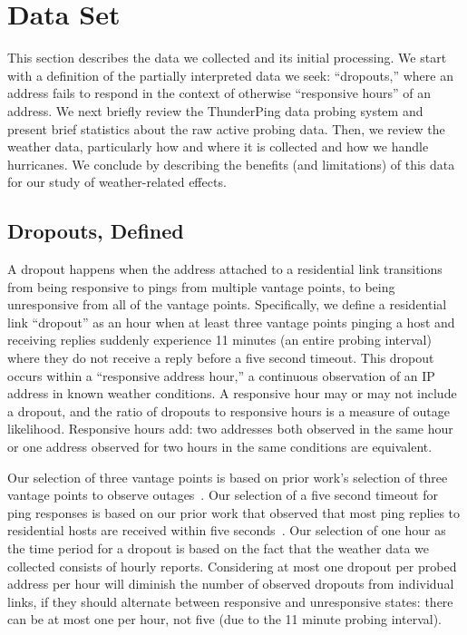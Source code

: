 \section{Data Set}

This section describes the data we collected and its initial
processing.
%
We start with a definition of the partially interpreted data
we seek: ``dropouts,'' where an address fails to respond in
the context of otherwise ``responsive hours'' of an address.
%
We next briefly review the ThunderPing data probing system and
present brief statistics about the raw active probing data.
% 
Then, we review the weather data, particularly how and
where it is collected and how we handle hurricanes.
%
We conclude by describing the benefits (and limitations) of this
data for our study of weather-related effects.

\subsection{Dropouts, Defined} %

A dropout happens when the address attached to a residential link transitions from
being responsive to pings from multiple vantage points, to being unresponsive
from all of the vantage points.
% 
Specifically, we define a residential link ``dropout'' as an hour when at least three
vantage points pinging a host and receiving replies suddenly experience 11 minutes
(an entire probing interval) where they do not receive a 
reply before a five second timeout.
%
This dropout occurs within a ``responsive address hour,'' a
continuous observation of an IP address in known weather
conditions.  A responsive hour may or may not include a
dropout, and the ratio of dropouts to responsive hours is a
measure of outage likelihood.  Responsive hours add: two
addresses both observed in the same hour or one address
observed for two hours in the same conditions are equivalent.

Our selection of three vantage points is based on prior work's selection
of three vantage points to observe outages~\cite{trinocular}.
%
Our selection of a five second timeout for ping responses is based on our
prior work that observed that most ping replies to residential
hosts are received within five seconds~\cite{timeouts-imc}.
%
Our selection of one hour as the time period for a dropout is based on the fact
that the weather data we collected consists of hourly reports.
%
Considering at most one dropout per probed address per hour will diminish the
number of observed dropouts from individual links, if they should alternate
between responsive and unresponsive states: there can be at most one per hour,
not five (due to the 11 minute probing interval).

